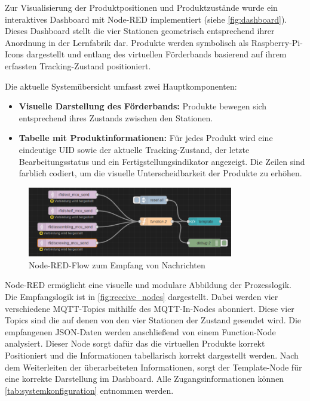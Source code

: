 Zur Visualisierung der Produktpositionen und Produktzustände wurde ein interaktives Dashboard mit Node-RED implementiert (siehe \autoref{fig:dashboard}). Dieses Dashboard stellt die vier Stationen geometrisch entsprechend ihrer Anordnung in der Lernfabrik dar. Produkte werden symbolisch als Raspberry-Pi-Icons dargestellt und entlang des virtuellen Förderbands basierend auf ihrem erfassten Tracking-Zustand positioniert.

Die aktuelle Systemübersicht umfasst zwei Hauptkomponenten:
\begin{itemize}
	\item \textbf{Visuelle Darstellung des Förderbands:} Produkte bewegen sich entsprechend ihres Zustands zwischen den Stationen.
	\item \textbf{Tabelle mit Produktinformationen:} Für jedes Produkt wird eine eindeutige UID sowie der aktuelle Tracking-Zustand, der letzte Bearbeitungsstatus und ein Fertigstellungsindikator angezeigt. Die Zeilen sind farblich codiert, um die visuelle Unterscheidbarkeit der Produkte zu erhöhen.
\end{itemize}

\begin{figure}[H]
	\centering
	\includegraphics[width=0.8\textwidth]{images/node-red-flow-receive.png}
	\caption{Node-RED-Flow zum Empfang von Nachrichten}
	\label{fig:receive_nodes}
\end{figure}

Node-RED ermöglicht eine visuelle und modulare Abbildung der Prozesslogik. Die Empfangslogik ist in \autoref{fig:receive_nodes} dargestellt. Dabei werden vier verschiedene MQTT-Topics mithilfe des MQTT-In-Nodes abonniert. Diese vier Topics sind die auf denen von den vier Stationen der Zustand gesendet wird. Die empfangenen JSON-Daten werden anschließend von einem Function-Node analysiert. Dieser Node sorgt dafür das die virtuellen Produkte korrekt Positioniert und die Informationen tabellarisch korrekt dargestellt werden. Nach dem Weiterleiten der überarbeiteten Informationen, sorgt der Template-Node für eine korrekte Darstellung im Dashboard. Alle Zugangsinformationen können \autoref{tab:systemkonfiguration} entnommen werden. 

